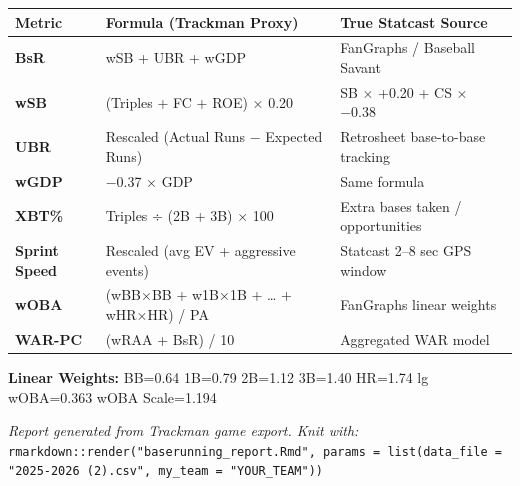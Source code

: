 \documentclass[
]{article}
\begin{document}
\begin{longtable}[]{@{}
  >{\raggedright\arraybackslash}p{}
  >{\raggedright\arraybackslash}p{}
  >{\raggedright\arraybackslash}p{}@{}}
\toprule\noalign{}
\begin{minipage}[b]{\linewidth}\raggedright
Metric
\end{minipage} & \begin{minipage}[b]{\linewidth}\raggedright
Formula (Trackman Proxy)
\end{minipage} & \begin{minipage}[b]{\linewidth}\raggedright
True Statcast Source
\end{minipage} \\
\midrule\noalign{}
\endhead
\bottomrule\noalign{}
\endlastfoot
\textbf{BsR} & wSB + UBR + wGDP & FanGraphs / Baseball Savant \\
\textbf{wSB} & (Triples + FC + ROE) × 0.20 & SB × +0.20 + CS × −0.38 \\
\textbf{UBR} & Rescaled (Actual Runs − Expected Runs) & Retrosheet
base-to-base tracking \\
\textbf{wGDP} & −0.37 × GDP & Same formula \\
\textbf{XBT\%} & Triples ÷ (2B + 3B) × 100 & Extra bases taken /
opportunities \\
\textbf{Sprint Speed} & Rescaled (avg EV + aggressive events) & Statcast
2--8 sec GPS window \\
\textbf{wOBA} & (wBB×BB + w1B×1B + \ldots{} + wHR×HR) / PA & FanGraphs
linear weights \\
\textbf{WAR-PC} & (wRAA + BsR) / 10 & Aggregated WAR model \\
\end{longtable}

\textbf{Linear Weights:} BB=0.64 \textbar{} 1B=0.79 \textbar{} 2B=1.12
\textbar{} 3B=1.40 \textbar{} HR=1.74 \textbar{} lg wOBA=0.363
\textbar{} wOBA Scale=1.194

\emph{Report generated from Trackman game export. Knit with:}
\texttt{rmarkdown::render("baserunning\_report.Rmd",\ params\ =\ list(data\_file\ =\ "2025-2026\ (2).csv",\ my\_team\ =\ "YOUR\_TEAM"))}
\end{document}
